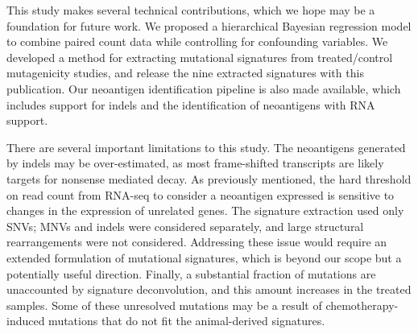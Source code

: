 This study makes several technical contributions, which we hope may be a foundation for future work. We proposed a hierarchical Bayesian regression model to combine paired count data while controlling for confounding variables. We developed a method for extracting mutational signatures from treated/control mutagenicity studies, and release the nine extracted signatures with this publication. Our neoantigen identification pipeline is also made available, which includes support for indels and the identification of neoantigens with RNA support. 

There are several important limitations to this study. The neoantigens generated by indels may be over-estimated, as most frame-shifted transcripts are likely targets for nonsense mediated decay. As previously mentioned, the hard threshold on read count from RNA-seq to consider a neoantigen expressed is sensitive to changes in the expression of unrelated genes. The signature extraction used only SNVs; MNVs and indels were considered separately, and large structural rearrangements were not considered. Addressing these issue would require an extended formulation of mutational signatures, which is beyond our scope but a potentially useful direction. Finally, a substantial fraction of mutations are unaccounted by signature deconvolution, and this amount increases in the treated samples. Some of these unresolved mutations may be a result of chemotherapy-induced mutations that do not fit the animal-derived signatures. 



